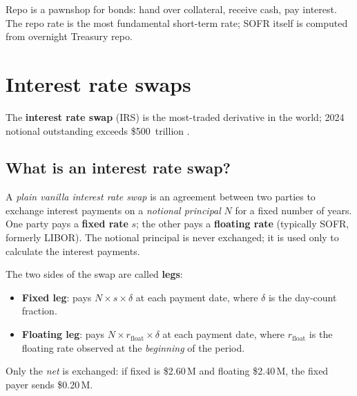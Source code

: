 \begin{intuitionbox}
Repo is a pawnshop for bonds: hand over collateral, receive cash, pay
interest.  The repo rate is the most fundamental short-term rate; SOFR
itself is computed from overnight Treasury repo.
\end{intuitionbox}


\section{Interest rate swaps}
\label{sec:fi_swaps}

The \textbf{interest rate swap} (IRS) is the most-traded derivative
in the world; 2024 notional outstanding exceeds \$500~trillion
\citeHull.

\subsection{What is an interest rate swap?}

\begin{definition}
A \emph{plain vanilla interest rate swap} is an agreement between two
parties to exchange interest payments on a \emph{notional principal}
$N$ for a fixed number of years.  One party pays a \textbf{fixed rate}
$s$; the other pays a \textbf{floating rate} (typically SOFR, formerly
LIBOR).  The notional principal is never exchanged; it is used
only to calculate the interest payments.
\end{definition}

The two sides of the swap are called \textbf{legs}:
\begin{itemize}
  \item \textbf{Fixed leg}: pays $N \times s \times \delta$ at each
    payment date, where $\delta$ is the day-count fraction.
  \item \textbf{Floating leg}: pays $N \times r_{\text{float}} \times
    \delta$ at each payment date, where $r_{\text{float}}$ is the
    floating rate observed at the \emph{beginning} of the period.
\end{itemize}

Only the \emph{net} is exchanged: if fixed is \$2.60\,M and floating
\$2.40\,M, the fixed payer sends \$0.20\,M.

